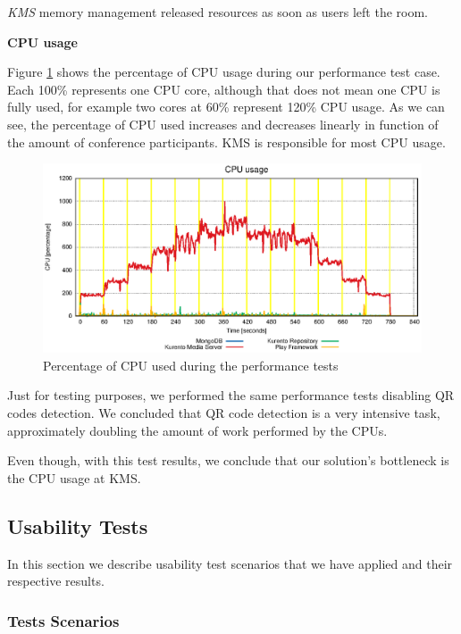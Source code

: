 \documentclass[conference,compsoc,a4paper]{IEEEtran}
\begin{document}
\emph{KMS} memory management released resources as soon as users left the room. 


\textbf{CPU usage}


Figure \ref{fig:test_full_features_cpu} shows the percentage of \gls{CPU} usage during our performance test case. Each 100\% represents one \gls{CPU} core, although that does not mean one \gls{CPU} is fully used, for example two cores at 60\% represent 120\% \gls{CPU} usage. As we can see, the percentage of \gls{CPU} used increases and decreases linearly in function of the amount of conference participants. \gls{KMS} is responsible for most \gls{CPU} usage.


\begin{figure}
  \centering
  \includegraphics[width=\linewidth]{stats/test_full_features_cpu.eps}
  \caption{Percentage of CPU used during the performance tests}
  \label{fig:test_full_features_cpu}
\end{figure}

  Just for testing purposes, we performed the same performance tests disabling \gls{QR} codes detection. We concluded that \gls{QR} code detection is a very intensive task, approximately doubling the amount of work performed by the \gls{CPU}s.

	Even though, with this test results, we conclude that our solution's bottleneck is the \gls{CPU} usage at \gls{KMS}.



\subsection {Usability Tests}
     In this section we describe usability test scenarios that we have applied and their respective results.


    \subsubsection{Tests Scenarios}
\end{document}
